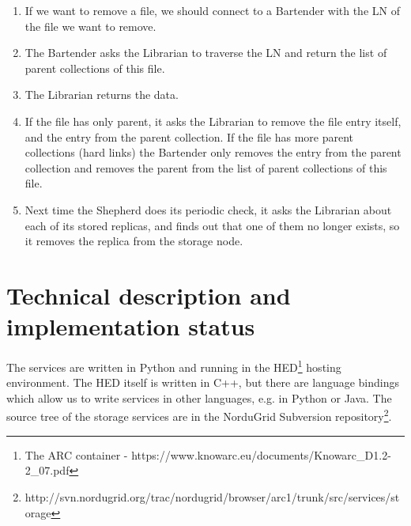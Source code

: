 \documentclass{book}
\begin{document}
\begin{figure}[ht]
\end{figure}
\begin{enumerate}
    \item If we want to remove a file, we should connect to a Bartender with the LN of the file we want to remove.
    \item The Bartender asks the Librarian to traverse the LN and return the list of parent collections of this file.
    \item The Librarian returns the data.
    \item If the file has only parent, it asks the Librarian to remove the file entry itself, and the entry from the parent collection. If the file has more parent collections (hard links) the Bartender only removes the entry from the parent collection and removes the parent from the list of parent  collections of this file.
    \item Next time the Shepherd does its periodic check, it asks the Librarian about each of its stored replicas, and finds out that one of them no longer exists, so it removes the replica from the storage node.
\end{enumerate}




\chapter{Technical description and implementation status} %
\label{cha:technical_description_and_implementation_status}

The services are written in Python and running in the HED\footnote{The ARC container - https://www.knowarc.eu/documents/Knowarc\_D1.2-2\_07.pdf} hosting environment. The HED itself is written in C++, but there are language bindings which allow us to write services in other languages, e.g. in Python or Java. The source tree of the storage services are in the NorduGrid Subversion repository\footnote{http://svn.nordugrid.org/trac/nordugrid/browser/arc1/trunk/src/services/storage}.
\end{document}
